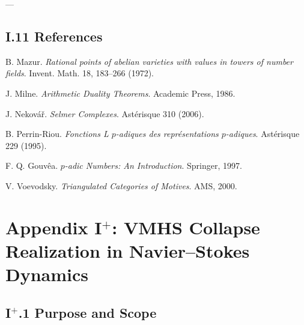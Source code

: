 \documentclass[11pt]{article}
\begin{document}
\begin{center}
\end{center}

---

\subsection*{I.11 References}

\begin{thebibliography}{9}

B. Mazur.  
\textit{Rational points of abelian varieties with values in towers of number fields}.  
Invent. Math. 18, 183–266 (1972).

J. Milne.  
\textit{Arithmetic Duality Theorems}. Academic Press, 1986.

J. Nekovář.  
\textit{Selmer Complexes}. Astérisque 310 (2006).

B. Perrin-Riou.  
\textit{Fonctions L $p$-adiques des représentations $p$-adiques}. Astérisque 229 (1995).

F. Q. Gouvêa.  
\textit{$p$-adic Numbers: An Introduction}. Springer, 1997.

V. Voevodsky.  
\textit{Triangulated Categories of Motives}. AMS, 2000.

\end{thebibliography}




\section*{Appendix I$^+$: VMHS Collapse Realization in Navier--Stokes Dynamics}

\subsection*{I$^+$.1 Purpose and Scope}
\end{document}
